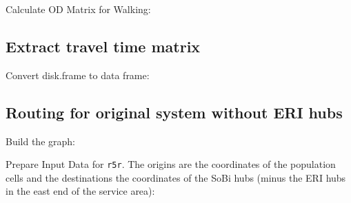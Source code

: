 \documentclass[
]{article}
\newenvironment{Shaded}{\begin{snugshade}}{\end{snugshade}}
\newcommand{\DataTypeTok}[1]{\textcolor[rgb]{0.13,0.29,0.53}{#1}}
\newcommand{\KeywordTok}[1]{\textcolor[rgb]{0.13,0.29,0.53}{\textbf{#1}}}
\newcommand{\NormalTok}[1]{#1}
\newcommand{\OperatorTok}[1]{\textcolor[rgb]{0.81,0.36,0.00}{\textbf{#1}}}
\newcommand{\StringTok}[1]{\textcolor[rgb]{0.31,0.60,0.02}{#1}}
\begin{document}
Calculate OD Matrix for Walking:

\hypertarget{extract-travel-time-matrix}{%
\subsection{Extract travel time
matrix}\label{extract-travel-time-matrix}}

Convert disk.frame to data frame:

\begin{Shaded}
\end{Shaded}

\hypertarget{routing-for-original-system-without-eri-hubs}{%
\subsection{Routing for original system without ERI
hubs}\label{routing-for-original-system-without-eri-hubs}}

Build the graph:

Prepare Input Data for \texttt{r5r}. The origins are the coordinates of
the population cells and the destinations the coordinates of the SoBi
hubs (minus the ERI hubs in the east end of the service area):
\end{document}
